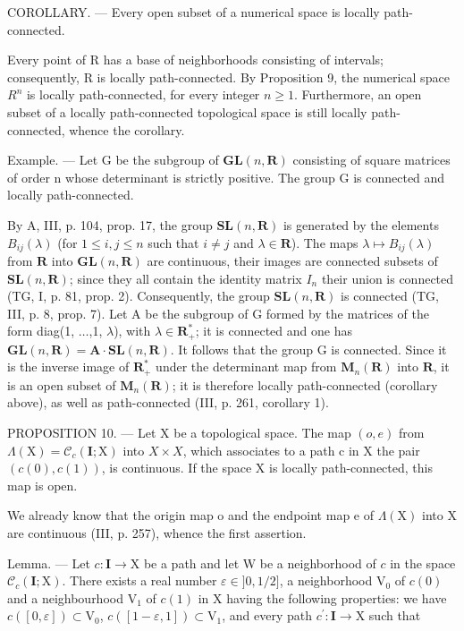COROLLARY. --- Every open subset of a numerical space is locally path-connected.

Every point of R has a base of neighborhoods consisting of intervals; consequently, R is locally path-connected. By Proposition 9, the numerical space \(R^{n}\) is locally path-connected, for every integer \(n \geqslant 1\). Furthermore, an open subset of a locally path-connected topological space is still locally path-connected, whence the corollary.

Example. --- Let G be the subgroup of \(\mathbf{GL}(n,\mathbf{R})\) consisting of square matrices of order n whose determinant is strictly positive. The group G is connected and locally path-connected.

By A, III, p. 104, prop. 17, the group \(\mathbf{SL}(n,\mathbf{R})\) is generated by the elements \(B_{ij}(\lambda)\) (for \(1\leqslant i,j\leqslant n\) such that \(i\neq j\) and \(\lambda\in\mathbf{R}\)). The maps \(\lambda\mapsto B_{ij}(\lambda)\) from \(\mathbf{R}\) into \(\mathbf{GL}(n,\mathbf{R})\) are continuous, their images are connected subsets of \(\mathbf{SL}(n,\mathbf{R})\); since they all contain the identity matrix \(I_n\) their union is connected (TG, I, p. 81, prop. 2). Consequently, the group \(\mathbf{SL}(n,\mathbf{R})\) is connected (TG, III, p. 8, prop. 7). Let A be the subgroup of G formed by the matrices of the form diag(1, \(\ldots\),1, \(\lambda\)), with \(\lambda\in\mathbf{R}_{+}^{*}\); it is connected and one has \(\mathbf{GL}(n,\mathbf{R})=\mathbf{A}\cdot\mathbf{SL}(n,\mathbf{R})\). It follows that the group G is connected. Since it is the inverse image of \(\mathbf{R}_{+}^{*}\) under the determinant map from \(\mathbf{M}_{n}(\mathbf{R})\) into \(\mathbf{R}\), it is an open subset of \(\mathbf{M}_{n}(\mathbf{R})\); it is therefore locally path-connected (corollary above), as well as path-connected (III, p. 261, corollary 1).

PROPOSITION 10. --- Let X be a topological space. The map \((o, e)\) from \(\Lambda(\mathrm{X}) = \mathcal{C}_{c}(\mathbf{I}; \mathrm{X})\) into \(X \times X\), which associates to a path c in X the pair \((c(0), c(1))\), is continuous. If the space X is locally path-connected, this map is open.

We already know that the origin map o and the endpoint map e of \(\Lambda(\mathrm{X})\) into X are continuous (III, p. 257), whence the first assertion.

Lemma. --- Let \(c\colon \mathbf{I}\to \mathrm{X}\) be a path and let W be a neighborhood of \(c\) in the space \(\mathcal{C}_c(\mathbf{I};\mathrm{X})\). There exists a real number \(\varepsilon \in ]0,1 / 2]\), a neighborhood \(\mathrm{V}_0\) of \(c(0)\) and a neighbourhood \(\mathrm{V}_1\) of \(c(1)\) in X having the following properties: we have \(c([0,\varepsilon])\subset \mathrm{V}_0\), \(c([1 - \varepsilon,1])\subset \mathrm{V}_1\), and every path \(c^{\prime}\colon \mathbf{I}\rightarrow \mathrm{X}\) such that


